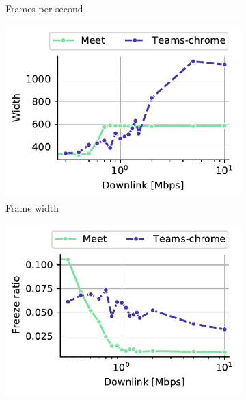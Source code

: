 \begin{figure}[]
\begin{subfigure}[t]{0.3\textwidth}
        \vspace{-2em}
    \caption{Frames per second}
    \label{subfig:downlink_frames_per_second}
    \end{subfigure}%
    \hfill
	\begin{subfigure}[t]{0.3\textwidth}   
        \centering
        \includegraphics[width=\textwidth]{figures/static/downlink_received_frameWidth.pdf}
        \vspace{-2em}
    \caption{Frame width}
    \label{subfig:downlink_frame_width}
    \end{subfigure}
    \newline
        \begin{subfigure}[t]{0.3\textwidth}      
    		\centering
        \includegraphics[width=\textwidth,keepaspectratio]{figures/static/downlink_freezeRatio.pdf}

\end{subfigure}
\end{figure}
